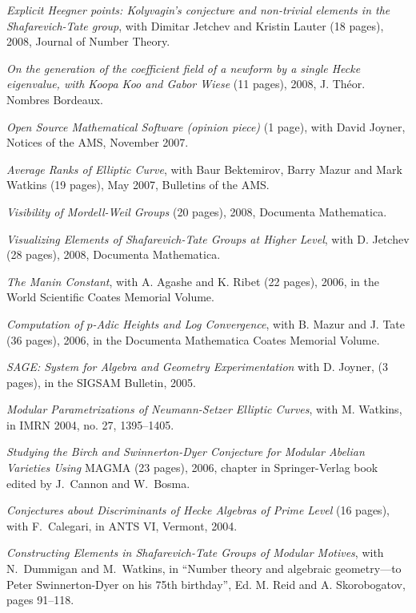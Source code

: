 \documentclass[10pt]{article}
\newcommand{\ptitle}{\em}
\newcounter{totalnumpapers}
\newenvironment{papers}
   {
   \begin{revnumerate}[\value{totalnumpapers}]
   {}
         {
            \setlength{\itemsep}{.5ex}
            \setlength{\parsep}{0ex}
            \setlength{\leftmargin}{0em}
            \setlength{\parskip}{0ex}
            \setlength{\topsep}{0ex}
         }
   }
   {
\end{revnumerate}
   }
\newcommand{\marginlabel}[1]{
\begin{minipage}[b]{0.8\labelwidth}{\large \textsf{\textbf{#1}}}\end{minipage}}
\newcommand{\entrylabel}[1]{\mbox{\marginlabel{#1}}\hfill}
\newcommand{\MainListlabel}[1]
   {
      \parbox[t]{\labelwidth}{\hspace{.8em}\marginlabel{#1}}
   }
\newenvironment{MainList}[1]
   {
      \renewcommand{\entrylabel}{\MainListlabel}
      \begin{list}{}
      {
         \renewcommand{\makelabel}{\entrylabel}
         \setlength   {\itemindent}{-.65em}
         \setlength   {\labelwidth}{#1}
         \setlength   {\leftmargin}{\labelwidth}
         \setlength   {\itemsep}{3ex}
      }
   }
   {
      \end{list}
   }
\begin{document}
\begin{MainList}{88pt}
\begin{papers}
\item {\ptitle Explicit Heegner points: Kolyvagin's conjecture and
    non-trivial elements in the Shafarevich-Tate group}, with Dimitar
  Jetchev and Kristin Lauter (18 pages), 2008, Journal of Number
  Theory.

\item {\ptitle On the generation of the coefficient field of a newform
    by a single Hecke eigenvalue, with Koopa Koo and Gabor Wiese} (11
  pages), 2008, J. Th\'eor. Nombres Bordeaux.

\item {\ptitle Open Source Mathematical Software (opinion piece)} (1 page),
 with David Joyner, Notices of the AMS, November 2007.

\item {\ptitle Average Ranks of Elliptic Curve}, with
Baur Bektemirov, Barry Mazur and Mark Watkins (19 pages), May 2007,
Bulletins of the AMS.

\item {\ptitle Visibility of Mordell-Weil Groups} (20 pages), 2008,
  Documenta Mathematica.

\item {\ptitle Visualizing Elements of Shafarevich-Tate Groups at
    Higher Level}, with D. Jetchev (28 pages), 2008, Documenta
  Mathematica.

\item {\ptitle The Manin Constant}, with A. Agashe and K. Ribet (22
  pages), 2006, in the World Scientific Coates Memorial Volume.

\item {\ptitle Computation of $p$-Adic Heights and Log Convergence},
with B. Mazur and J. Tate (36 pages), 2006, in the Documenta
Mathematica Coates Memorial Volume.

\item {\ptitle SAGE: System for Algebra and Geometry Experimentation}
  with D. Joyner, (3 pages), in the SIGSAM Bulletin, 2005.

\item {\ptitle Modular Parametrizations of Neumann-Setzer
Elliptic Curves}, with M. Watkins, in IMRN 2004, no. 27, 1395--1405.

\item {\ptitle Studying the Birch and Swinnerton-Dyer Conjecture for
    Modular Abelian Varieties Using} MAGMA (23 pages), 2006, chapter in
  Springer-Verlag book edited by J.~Cannon and W.~Bosma.

\item {\ptitle Conjectures about Discriminants of Hecke Algebras of
Prime Level} (16 pages), with F.~Calegari, in ANTS VI, Vermont, 2004.
\item {\ptitle Constructing Elements in Shafarevich-Tate Groups of Modular
Motives},
   with N.~Dummigan and M.~Watkins, in ``Number theory and algebraic geometry---to Peter Swinnerton-Dyer on his 75th birthday'', Ed.
   M. Reid and A. Skorobogatov, pages 91--118.


\end{papers}
\end{MainList}
\end{document}
